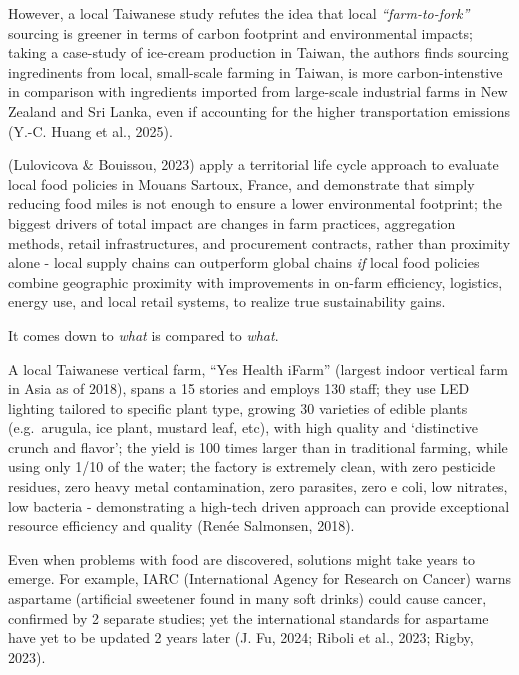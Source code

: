 \documentclass[
  12pt,
  letterpaper,
  DIV=11,
  numbers=noendperiod]{scrartcl}
\begin{document}
However, a local Taiwanese study refutes the idea that local
\emph{``farm-to-fork''} sourcing is greener in terms of carbon footprint
and environmental impacts; taking a case-study of ice-cream production
in Taiwan, the authors finds sourcing ingredinents from local,
small-scale farming in Taiwan, is more carbon-intenstive in comparison
with ingredients imported from large-scale industrial farms in New
Zealand and Sri Lanka, even if accounting for the higher transportation
emissions (Y.-C. Huang et al., 2025).

(Lulovicova \& Bouissou, 2023) apply a territorial life cycle approach
to evaluate local food policies in Mouans Sartoux, France, and
demonstrate that simply reducing food miles is not enough to ensure a
lower environmental footprint; the biggest drivers of total impact are
changes in farm practices, aggregation methods, retail infrastructures,
and procurement contracts, rather than proximity alone - local supply
chains can outperform global chains \emph{if} local food policies
combine geographic proximity with improvements in on-farm efficiency,
logistics, energy use, and local retail systems, to realize true
sustainability gains.

It comes down to \emph{what} is compared to \emph{what}.

A local Taiwanese vertical farm, ``Yes Health iFarm'' (largest indoor
vertical farm in Asia as of 2018), spans a 15 stories and employs 130
staff; they use LED lighting tailored to specific plant type, growing 30
varieties of edible plants (e.g.~arugula, ice plant, mustard leaf, etc),
with high quality and `distinctive crunch and flavor'; the yield is 100
times larger than in traditional farming, while using only 1/10 of the
water; the factory is extremely clean, with zero pesticide residues,
zero heavy metal contamination, zero parasites, zero e coli, low
nitrates, low bacteria - demonstrating a high-tech driven approach can
provide exceptional resource efficiency and quality (Renée Salmonsen,
2018).

Even when problems with food are discovered, solutions might take years
to emerge. For example, IARC (International Agency for Research on
Cancer) warns aspartame (artificial sweetener found in many soft drinks)
could cause cancer, confirmed by 2 separate studies; yet the
international standards for aspartame have yet to be updated 2 years
later (J. Fu, 2024; Riboli et al., 2023; Rigby, 2023).
\end{document}
